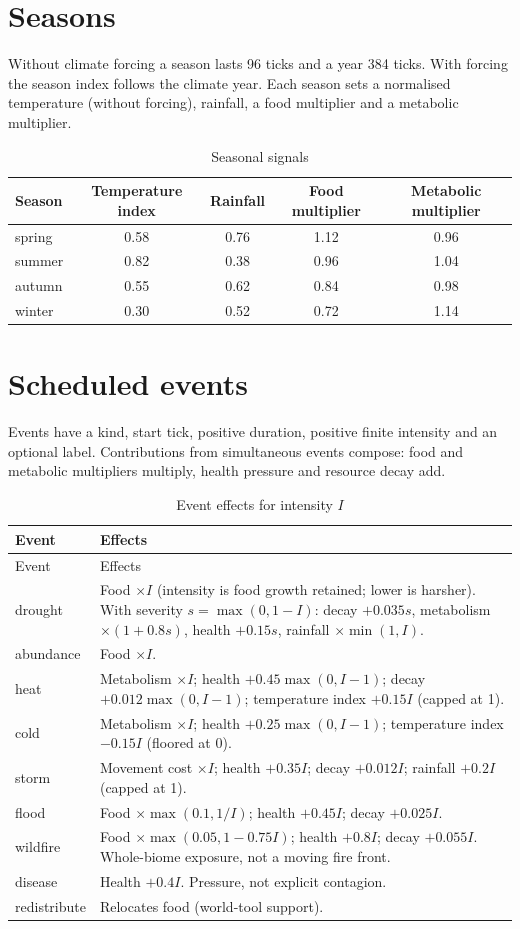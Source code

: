 \section{Seasons}
Without climate forcing a season lasts 96 ticks and a year 384 ticks. With
forcing the season index follows the climate year. Each season sets a normalised
temperature (without forcing), rainfall, a food multiplier and a metabolic multiplier.

\begin{table}[htbp]
\centering
\caption{Seasonal signals}
\begin{tabular}{lcccc}
\toprule
Season & Temperature index & Rainfall & Food multiplier & Metabolic multiplier \\
\midrule
spring & 0.58 & 0.76 & 1.12 & 0.96 \\
summer & 0.82 & 0.38 & 0.96 & 1.04 \\
autumn & 0.55 & 0.62 & 0.84 & 0.98 \\
winter & 0.30 & 0.52 & 0.72 & 1.14 \\
\bottomrule
\end{tabular}
\end{table}

\section{Scheduled events}
Events have a kind, start tick, positive duration, positive finite intensity and an
optional label. Contributions from simultaneous events compose: food and
metabolic multipliers multiply, health pressure and resource decay add.

\begin{longtable}{p{2cm}p{12.4cm}}
\caption{Event effects for intensity $I$}\\
\toprule
Event & Effects \\
\midrule
\endfirsthead
\toprule
Event & Effects \\
\midrule
\endhead
drought & Food $\times I$ (intensity is food growth retained; lower is harsher). With severity $s=\max(0,1-I)$: decay $+0.035s$, metabolism $\times(1+0.8s)$, health $+0.15s$, rainfall $\times\min(1,I)$. \\
abundance & Food $\times I$. \\
heat & Metabolism $\times I$; health $+0.45\max(0,I-1)$; decay $+0.012\max(0,I-1)$; temperature index $+0.15I$ (capped at 1). \\
cold & Metabolism $\times I$; health $+0.25\max(0,I-1)$; temperature index $-0.15I$ (floored at 0). \\
storm & Movement cost $\times I$; health $+0.35I$; decay $+0.012I$; rainfall $+0.2I$ (capped at 1). \\
flood & Food $\times\max(0.1,1/I)$; health $+0.45I$; decay $+0.025I$. \\
wildfire & Food $\times\max(0.05,1-0.75I)$; health $+0.8I$; decay $+0.055I$. Whole-biome exposure, not a moving fire front. \\
disease & Health $+0.4I$. Pressure, not explicit contagion. \\
redistribute & Relocates food (world-tool support). \\
\bottomrule
\end{longtable}

